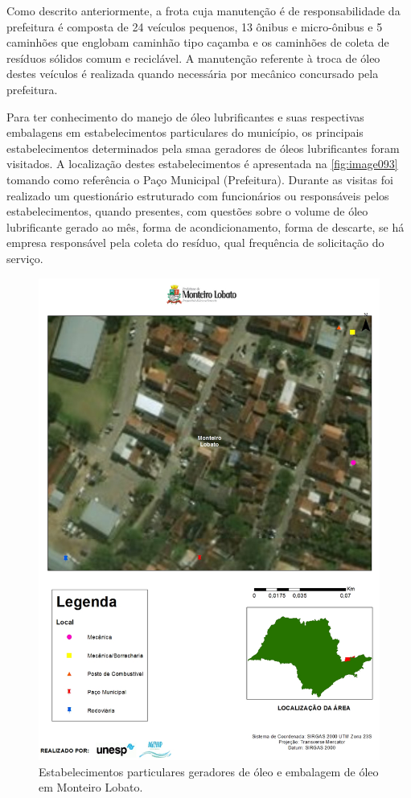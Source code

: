 \begin{description}
	Como descrito anteriormente, a frota cuja manutenção é de responsabilidade da prefeitura é composta de 24 veículos pequenos, 13 	ônibus e micro-ônibus e 5 caminhões que englobam caminhão tipo caçamba e os caminhões de coleta de resíduos sólidos comum e reciclável. A manutenção referente à troca de óleo destes veículos é realizada quando necessária por mecânico concursado pela prefeitura.
	
	Para ter conhecimento do manejo de óleo lubrificantes e suas respectivas embalagens em estabelecimentos particulares do município, os principais estabelecimentos determinados pela \gls{smaa} geradores de óleos lubrificantes foram visitados. A localização destes estabelecimentos é apresentada na \autoref{fig:image093} tomando como referência o Paço Municipal (Prefeitura). Durante as visitas foi realizado um questionário estruturado com funcionários ou responsáveis pelos estabelecimentos, quando presentes, com questões sobre o volume de óleo lubrificante gerado ao mês, forma de acondicionamento, forma de descarte, se há empresa responsável pela coleta do resíduo, qual frequência de solicitação do serviço.
	
	\begin{figure}
		\centering
		\includegraphics[width=1\linewidth]{produtos/prodtres/image093}
		\caption{Estabelecimentos particulares geradores de óleo e embalagem de óleo em Monteiro Lobato.}
		\label{fig:image093}
	\end{figure}
	

\end{description}
